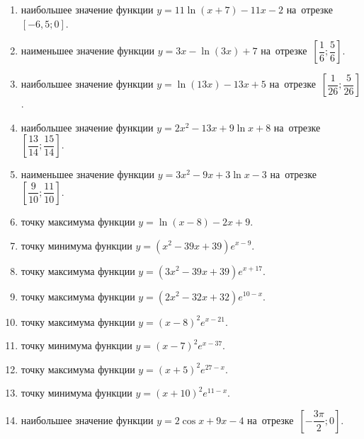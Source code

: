 \documentclass[a4paper,10pt]{article}
\begin{document}
\begin{enumerate}
\item {} наибольшее значение функции $y = 11\ln \left(x+7\right)-11x -2$ на~отрезке~$\left[-6,5;0\right]$.

\item {} наименьшее значение функции $y = 3x-\ln \left(3x\right)+7$ на~отрезке~$\left[\dfrac{1}{6};\dfrac{5}{6}\right]$.

\item {} наибольшее значение функции $y = \ln \left(13x\right)-13x+5$ на~отрезке~$\left[\dfrac{1}{26};\dfrac{5}{26}\right]$.

\item {} наибольшее значение функции $y=2x^2-13x+9\ln x+8$ на~отрезке~$\left[\dfrac{13}{14};\dfrac{15}{14}\right]$.







\item {} наименьшее значение функции $y=3x^2-9x+3\ln x-3$ на~отрезке~$\left[\dfrac{9}{10};\dfrac{11}{10}\right]$.

\item {} точку максимума функции $y=\ln \left(x-8\right)-2x+9$.

\item {} точку минимума функции $y=\left(x^2-39x+39\right)e^{x-9}$.

\item {} точку максимума функции $y=\left(3x^2-39x+39\right)e^{x+17}$.

\item {} точку максимума функции $y=\left(2x^2-32x+32\right)e^{10-x}$.

\item {} точку максимума функции $y=\left(x -8\right)^2e^{x-21}$.

\item {} точку минимума функции $y=\left(x -7\right)^2e^{x-37}$.

\item {} точку максимума функции $y=\left(x +5\right)^2e^{27-x}$.

\item {} точку минимума функции $y=\left(x +10\right)^2e^{11-x}$.

\item {} наибольшее значение функции $y=2\cos x+9x -4$ на~отрезке~$\left[-\dfrac{3\pi }{2};0\right]$.


\end{enumerate}
\end{document}
